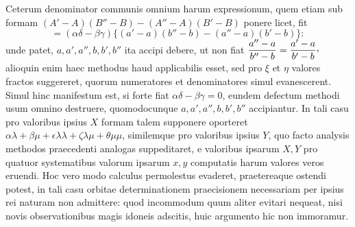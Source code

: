 Ceterum denominator communis omnium harum expressionum, quem etiam
sub formam $(A'-A)(B''-B)-(A''-A)(B'-B)$ ponere licet, fit
\[
=(\alpha\delta-\beta\gamma)\{(a'-a)(b''-b)-(a''-a)(b'-b)\}:
\]
unde patet, $a,a',a'',b,b',b''$ ita accipi debere, ut non fiat
$\dfrac{a''-a}{b''-b}=\dfrac{a'-a}{b'-b}\mathpunct{\raisebox{.45ex}{,}}$
alioquin enim haec methodus haud applicabilis esset, sed pro $\xi$ et $\eta$ valores
fractos suggereret, quorum numeratores et denominatores simul evanescerent.
Simul hinc manifestum est, si forte fiat $\alpha\delta-\beta\gamma=0$, eundem defectum methodi
usum omnino destruere, quomodocunque $a,a',a'',b,b',b''$ accipiantur.
In tali casu pro valoribus ipsius $X$ formam talem supponere oporteret $\alpha\lambda+\beta\mu+\epsilon\lambda\lambda+\zeta\lambda\mu+\theta\mu\mu$, similemque pro valoribus ipsius $Y$, quo facto analysis
methodos praecedenti analogas suppeditaret, e valoribus ipsarum $X,Y$ pro
quatuor systematibus valorum ipsarum $x,y$ computatis harum valores veros
eruendi. Hoc vero modo calculus permolestus evaderet, praetereaque ostendi
potest, in tali casu orbitae determinationem praecisionem necessariam per
ipsius rei naturam non admittere: quod incommodum quum aliter evitari nequeat,
nisi novis observationibus magis idoneis adscitis, huic argumento hic
non immoramur.
